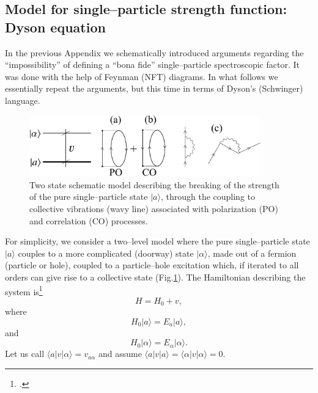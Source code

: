 \begin{subappendices}
\section[Single--particle strength function]{Model for single--particle strength function:
 Dyson equation}\label{C6AppB}
In the previous Appendix we schematically introduced  arguments regarding the ``impossibility'' of defining a ``bona fide'' single--particle spectroscopic factor. It was done with the help of Feynman (NFT) diagrams. In what follows we essentially repeat the arguments, but this time in terms of Dyson's (Schwinger) language.
 \begin{figure}
\centerline{\includegraphics*[width=10cm,angle=0]{C6/figs_C6/fig6_B1}}
\caption{Two state schematic model describing the breaking of the strength of the pure single--particle state $|a\rangle$, through the coupling to collective vibrations (wavy line) associated with polarization (PO) and correlation (CO) processes.}\label{fig6_B1}
\end{figure}
For simplicity, we consider a two--level model where the pure single--particle state $|a\rangle$ couples to a more complicated  (doorway) state
$|\alpha\rangle$, made out of a fermion (particle or hole), coupled to a particle--hole excitation which, if iterated to all orders can give rise to a collective state (Fig.\ref{fig6_B1}). The Hamiltonian describing the system is\footnote{ \cite{Bohr:69}.}
 \begin{equation}
 H=H_0+v,
 \end{equation}
 where
  \begin{equation}
  H_0|a\rangle=E_a|a\rangle,
  \end{equation}
  and
    \begin{equation}
    H_0|\alpha\rangle=E_\alpha|\alpha\rangle.
    \end{equation}
  Let us call $\langle a|v|\alpha\rangle=v_{a\alpha}$ and assume $\langle a|v|a\rangle=\langle \alpha|v|\alpha \rangle=0$.
  

\end{subappendices}
